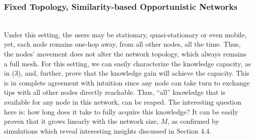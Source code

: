 \documentclass[conference]{IEEEtran}
\theoremstyle{definition}
\begin{document}
\subsubsection{Fixed Topology, Similarity-based Opportunistic Networks}
\vspace{-0.2 cm}
%
\\
Under this setting, the users may be stationary, quasi-stationary or even mobile, yet, each
node remains one-hop away, from all other nodes, all the time. Thus, the nodes' movement does not alter the network topology, which always remains a full mesh. 
For this setting, we can easily characterize the knowledge capacity, as in (3), and, further, prove that the knowledge gain will achieve the capacity. This is in complete agreement with intuition since any node can take turn to exchange tips with all other nodes directly reachable. Thus, ``all'' knowledge that is available for any node in this network, can be reaped. The interesting question here is: how long does it take 
to fully acquire this knowledge? It can be easily proven that it grows linearly with the network size, $M$, as confirmed by simulations which reveal interesting insights discussed in Section 4.4.
%
\end{document}
